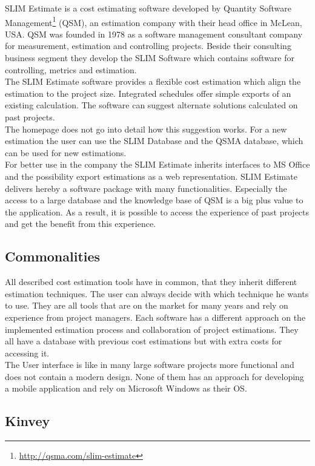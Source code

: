 SLIM Estimate is a cost estimating software developed by Quantity Software Management\footnote{\url{http://qsma.com/slim-estimate}} (QSM), an estimation company with their head office in McLean, USA. QSM was founded in 1978 as a software management consultant company for measurement, estimation and controlling projects. Beside their consulting business segment they develop the SLIM Software which contains software for controlling, metrics and estimation.
\\
The SLIM Estimate software provides a flexible cost estimation which align the estimation to the project size. Integrated schedules offer simple exports of an existing calculation. The software can suggest alternate solutions calculated on past projects.
\\
The homepage does not go into detail how this suggestion works. For a new estimation the user can use the SLIM Database and the QSMA database, which can be used for new estimations.
\\
For better use in the company the SLIM Estimate inherits interfaces to MS Office and the possibility export estimations as a web representation. SLIM Estimate delivers hereby a software package with many functionalities. Especially the access to a large database and the knowledge base of QSM is a big plus value to the application. As a result, it is possible to access the experience of past projects and get the benefit from this experience.


\subsection{Commonalities}

All described cost estimation tools have in common, that they inherit different estimation techniques. The user can always decide with which technique he wants to use. They are all tools that are on the market for many years and rely on experience from project managers. Each software has a different approach on the implemented estimation process and collaboration of project estimations. They all have a database with previous cost estimations but with extra costs for accessing it.\\
The User interface is like in many large software projects more functional and does not contain a modern design. None of them has an approach for developing a mobile application and rely on Microsoft Windows as their OS.

\subsection{Kinvey}


